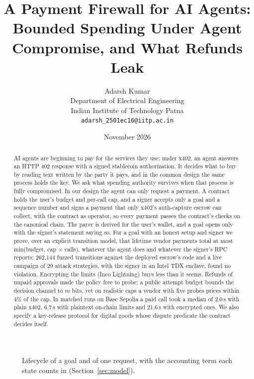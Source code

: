 \documentclass[10pt,a4paper,twocolumn]{article}
\title{\Large\textbf{A Payment Firewall for AI Agents:\\ Bounded Spending Under Agent Compromise, and What Refunds Leak}}
\author{Adarsh Kumar\\ Department of Electrical Engineering\\ Indian Institute of Technology Patna\\ \small\texttt{adarsh\_2501ec16@iitp.ac.in}}
\date{November 2026}
\begin{document}
\maketitle

\begin{abstract}
AI agents are beginning to pay for the services they use: under x402, an agent answers an HTTP 402 response with a signed stablecoin
authorization. It decides what to buy by reading text written by the party it pays, and in the common design the same process holds the key.
We ask what spending authority survives when that process is fully compromised. In our design the agent can only request a payment. A contract
holds the user's budget and per-call cap, and a signer accepts only a goal and a sequence number and signs a payment that only x402's
auth-capture escrow can collect, with the contract as operator, so every payment passes the contract's checks on the canonical chain. The payer is
derived for the user's wallet, and a goal opens only with the signer's statement saying so. For a goal with an honest setup and signer we prove,
over an explicit transition model, that lifetime vendor payments total at most min(budget, cap $\times$ calls), whatever the agent does and whatever
the signer's RPC reports; 262,144 fuzzed transitions against the deployed escrow's code and a live campaign of 29 attack strategies, with the
signer in an Intel TDX enclave, found no violation. Encrypting the limits (Inco Lightning) buys less than it seems. Refunds of unpaid approvals made the
policy free to probe; a public attempt budget bounds the decision channel to $m$ bits, yet on realistic caps a vendor with five probes prices within 4\% of
the cap. In matched runs on Base Sepolia a paid call took a median of 2.0\,s with plain x402, 6.7\,s with plaintext on-chain limits and 21.6\,s with
encrypted ones. We also specify a key-release protocol for digital goods whose dispute predicate the contract decides itself.
\end{abstract}






\begin{figure}[t]
\centering
\resizebox{\linewidth}{!}{}
\caption{Lifecycle of a goal and of one request, with the accounting term each state counts in (Section~\ref{sec:model}).}
\label{fig:states}
\end{figure}





\end{document}
